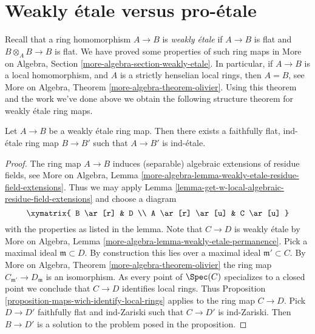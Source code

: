 \section{Weakly \'etale versus pro-\'etale}
\label{section-weakly-etale}

\noindent
Recall that a ring homomorphism $A \to B$ is {\it weakly \'etale}
if $A \to B$ is flat and $B \otimes_A B \to B$ is flat. We have
proved some properties of such ring maps in
More on Algebra, Section \ref{more-algebra-section-weakly-etale}.
In particular, if $A \to B$ is a local homomorphism, and $A$ is a
strictly henselian local rings, then $A = B$, see
More on Algebra, Theorem \ref{more-algebra-theorem-olivier}.
Using this theorem and the work we've done above we obtain
the following structure theorem for weakly \'etale ring maps.

\begin{proposition}
\label{proposition-weakly-etale}
Let $A \to B$ be a weakly \'etale ring map.
Then there exists a faithfully flat, ind-\'etale ring map
$B \to B'$ such that $A \to B'$ is ind-\'etale.
\end{proposition}

\begin{proof}
The ring map $A \to B$ induces (separable) algebraic extensions of
residue fields, see More on Algebra, Lemma
\ref{more-algebra-lemma-weakly-etale-residue-field-extensions}.
Thus we may apply
Lemma \ref{lemma-get-w-local-algebraic-residue-field-extensions}
and choose a diagram
$$
\xymatrix{
B \ar[r] & D \\
A \ar[r] \ar[u] & C \ar[u]
}
$$
with the properties as listed in the lemma. Note that $C \to D$
is weakly \'etale by
More on Algebra, Lemma \ref{more-algebra-lemma-weakly-etale-permanence}.
Pick a maximal ideal $\mathfrak m \subset D$. By construction
this lies over a maximal ideal $\mathfrak m' \subset C$.
By More on Algebra, Theorem \ref{more-algebra-theorem-olivier}
the ring map $C_{\mathfrak m'} \to D_\mathfrak m$ is an isomorphism.
As every point of $\Spec(C)$ specializes to a closed point we conclude that
$C \to D$ identifies local rings.
Thus Proposition \ref{proposition-maps-wich-identify-local-rings}
applies to the ring map $C \to D$. Pick $D \to D'$ faithfully flat
and ind-Zariski such that $C \to D'$ is ind-Zariski. Then
$B \to D'$ is a solution to the problem posed in the proposition.
\end{proof}








